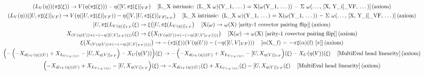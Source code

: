 \documentclass[11pt]{article}
\begin{document}
{\begin{gather*}
\left(L_V\!\left(\eta\right)\right)\!\left(\pi\sharp\!\left(\xi\right)\right) \to V\!\left(\eta\!\left(\pi\sharp\!\left(\xi\right)\right)\right) - \eta\!\left([V,\pi\sharp(\xi)]_{VF}\right) \quad \text{[L\_X intrinsic: (L\_X \ensuremath{\omega})(Y\_1, \ensuremath{\dots}) = X(\ensuremath{\omega}(Y\_1, \ensuremath{\dots})) \ensuremath{-} \ensuremath{\Sigma} \ensuremath{\omega}(\ensuremath{\dots}, [X, Y\_i]\_VF, \ensuremath{\dots})]\,(axiom)} \\
\left(L_V\!\left(\eta\right)\right)\!\left([U,\pi\sharp(\xi)]_{VF}\right) \to V\!\left(\eta\!\left([U,\pi\sharp(\xi)]_{VF}\right)\right) - \eta\!\left([V,[U,\pi\sharp(\xi)]_{VF]_{VF}}\right) \quad \text{[L\_X intrinsic: (L\_X \ensuremath{\omega})(Y\_1, \ensuremath{\dots}) = X(\ensuremath{\omega}(Y\_1, \ensuremath{\dots})) \ensuremath{-} \ensuremath{\Sigma} \ensuremath{\omega}(\ensuremath{\dots}, [X, Y\_i]\_VF, \ensuremath{\dots})]\,(axiom)} \\
[U,\pi\sharp(L_{V(\eta))]_{VF}}\!\left(\xi\right) \to \xi\!\left([U,\pi\sharp(L_{V(\eta))]_{VF}}\right) \quad \text{[X(\ensuremath{\omega}) \ensuremath{\to} \ensuremath{\omega}(X)  [arity-1 covector pairing flip]]\,(axiom)} \\
X_{(V(\eta(U)) + (-(-\eta([U,V]_{VF}))))}\!\left(\xi\right) \to \xi\!\left(X_{(V(\eta(U)) + (-(-\eta([U,V]_{VF}))))}\right) \quad \text{[X(\ensuremath{\omega}) \ensuremath{\to} \ensuremath{\omega}(X)  [arity-1 covector pairing flip]]\,(axiom)} \\
\xi\!\left(X_{(V(\eta(U)) + (-(-\eta([U,V]_{VF}))))}\right) \to -\left(\pi\sharp\!\left(\xi\right)\right)\!\left(V\!\left(\eta\!\left(U\right)\right) - \left(-\eta\!\left([U,V]_{VF}\right)\right)\right) \quad \text{[\ensuremath{\alpha}(X\_f) = \ensuremath{-}\ensuremath{\pi}\ensuremath{\sharp}(\ensuremath{\alpha})(f) [\ensuremath{\pi}]]\,(axiom)} \\
\left(-\left(-X_{d(\iota_V(\eta))(U)} + X_{L_{U(\iota_V(\eta))}} - [U,X_{\eta(V)]_{VF}}\right) - X_U(\eta(V))\right)\!\left(\xi\right) \to -\left(-X_{d(\iota_V(\eta))(U)} + X_{L_{U(\iota_V(\eta))}} - [U,X_{\eta(V)]_{VF}}\right)\!\left(\xi\right) - X_U(\eta(V))\!\left(\xi\right) \quad \text{[MultiEval head linearity]\,(axiom)} \\
\left(-X_{d(\iota_V(\eta))(U)} + X_{L_{U(\iota_V(\eta))}} - [U,X_{\eta(V)]_{VF}}\right)\!\left(\xi\right) \to -X_{d(\iota_V(\eta))(U)}\!\left(\xi\right) + X_{L_{U(\iota_V(\eta))}}\!\left(\xi\right) - [U,X_{\eta(V)]_{VF}}\!\left(\xi\right) \quad \text{[MultiEval head linearity]\,(axiom)} \\

\end{gather*}}
\end{document}

